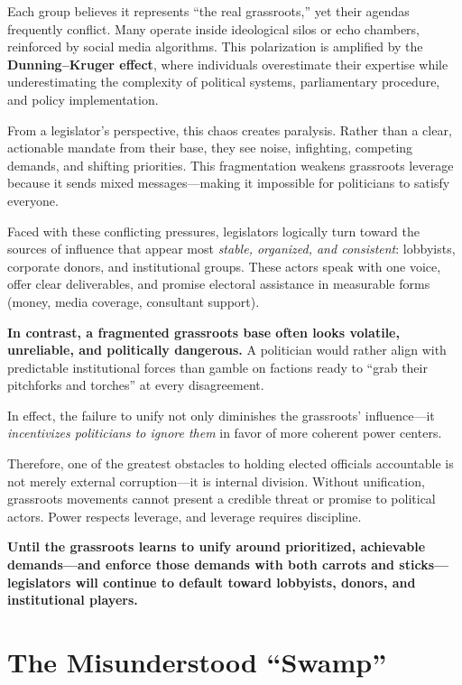 Each group believes it represents ``the real grassroots,'' yet their agendas frequently conflict. Many operate inside ideological silos or echo chambers, reinforced by social media algorithms. This polarization is amplified by the \textbf{Dunning–Kruger effect}, where individuals overestimate their expertise while underestimating the complexity of political systems, parliamentary procedure, and policy implementation.

From a legislator’s perspective, this chaos creates paralysis. Rather than a clear, actionable mandate from their base, they see noise, infighting, competing demands, and shifting priorities. This fragmentation weakens grassroots leverage because it sends mixed messages—making it impossible for politicians to satisfy everyone.

Faced with these conflicting pressures, legislators logically turn toward the sources of influence that appear most \emph{stable, organized, and consistent}: lobbyists, corporate donors, and institutional groups. These actors speak with one voice, offer clear deliverables, and promise electoral assistance in measurable forms (money, media coverage, consultant support).

\textbf{In contrast, a fragmented grassroots base often looks volatile, unreliable, and politically dangerous.} A politician would rather align with predictable institutional forces than gamble on factions ready to “grab their pitchforks and torches” at every disagreement.

In effect, the failure to unify not only diminishes the grassroots’ influence—it \emph{incentivizes politicians to ignore them} in favor of more coherent power centers.

Therefore, one of the greatest obstacles to holding elected officials accountable is not merely external corruption—it is internal division. Without unification, grassroots movements cannot present a credible threat or promise to political actors. Power respects leverage, and leverage requires discipline.

\textbf{Until the grassroots learns to unify around prioritized, achievable demands—and enforce those demands with both carrots and sticks—legislators will continue to default toward lobbyists, donors, and institutional players.}

\section{The Misunderstood ``Swamp''}

